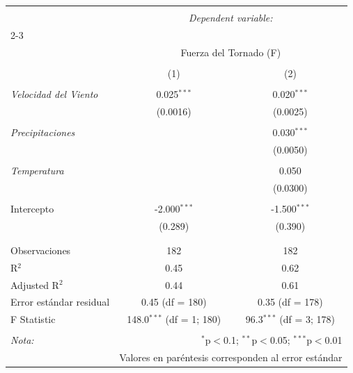 \documentclass[10pt,a4paper]{article}
\begin{document}
\begin{enumerate}
\begin{table}[H] \centering 
  \label{tab:tornado_reg} 
\begin{tabular}{@{\extracolsep{5pt}}lcc} 
\\[-1.8ex]\hline 
\hline \\[-1.8ex] 
 & \multicolumn{2}{c}{\textit{Dependent variable:}} \\ 
\cline{2-3} 
\\[-1.8ex] & \multicolumn{2}{c}{Fuerza del Tornado (F)} \\ 
\\[-1.8ex] & (1) & (2) \\ 
\hline \\[-1.8ex] 
 \textit{Velocidad del Viento} & 0.025$^{***}$ & 0.020$^{***}$ \\ 
  & (0.0016) & (0.0025) \\ 
  & & \\ 
 \textit{Precipitaciones} &  & 0.030$^{***}$ \\ 
  &  & (0.0050) \\ 
  & & \\ 
 \textit{Temperatura} &  & 0.050 \\ 
  &  & (0.0300) \\ 
  & & \\ 
 Intercepto & -2.000$^{***}$ & -1.500$^{***}$ \\ 
  & (0.289) & (0.390) \\ 
  & & \\ 
\hline \\[-1.8ex] 
Observaciones & 182 & 182 \\ 
R$^{2}$ & 0.45 & 0.62 \\ 
Adjusted R$^{2}$ & 0.44 & 0.61 \\ 
Error estándar residual & 0.45 (df = 180) & 0.35 (df = 178) \\ 
F Statistic & 148.0$^{***}$ (df = 1; 180) & 96.3$^{***}$ (df = 3; 178) \\ 
\hline 
\hline \\[-1.8ex] 
\textit{Nota:}  & \multicolumn{2}{r}{$^{*}$p$<$0.1; $^{**}$p$<$0.05; $^{***}$p$<$0.01} \\
\textit{}  & \multicolumn{2}{r}{Valores en paréntesis corresponden al error estándar}
\end{tabular} 
\end{table}  


\end{enumerate}
\end{document}
